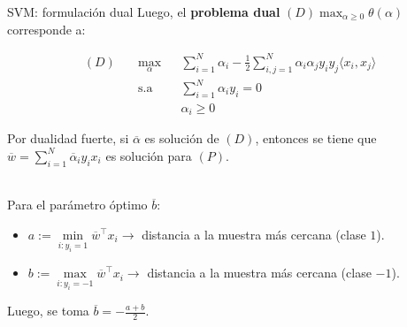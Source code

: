 \documentclass[handout, 9pt]{beamer}
\begin{document}
\begin{frame}{SVM: formulación dual}
	Luego, el \textbf{problema dual} $(D) \max_{\alpha\geq 0} \theta(\alpha)$  corresponde a:
	
\begin{equation*}
\begin{aligned}
(D)\quad & \underset{\alpha}{\max}
& & \sum\limits_{i=1}^{N}\alpha_i - \frac{1}{2} \sum\limits_{i,j=1}^{N} \alpha_i \alpha_j y_i y_j \langle x_i, x_j\rangle\\
& \text{s.a}
& & \sum\limits_{i=1}^{N} \alpha_i y_i= 0 \\
& &  &\alpha_i \geq 0
\end{aligned} \label{eq:dualSVM}
\end{equation*}
	
Por dualidad fuerte, si $\overline{\alpha}$ es solución de $(D)$, entonces se tiene que $\overline{w} = \sum_{i=1}^N \overline{\alpha}_i y_i x_i$	es solución para $(P)$.\\~\

Para el parámetro óptimo $\overline{b}$:

\begin{itemize}
	\item $a:=\min\limits_{i:y_i=1} \overline{w}^\top x_i \rightarrow$ distancia a la muestra más cercana (clase $1$).
	\item $b:=\max\limits_{i:y_i=-1} \overline{w}^\top x_i \rightarrow$ distancia a la muestra más cercana (clase $-1$).
\end{itemize}

Luego, se toma $\overline{b}=-\frac{a+b}{2}$.

\end{frame}
\end{document}
